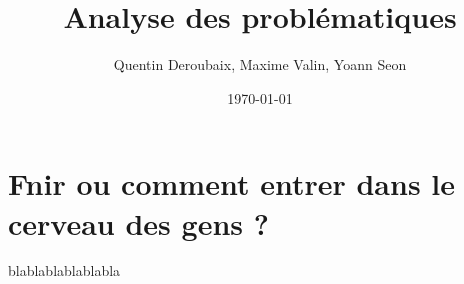 \documentclass[fr]{article}
\begin{document}
\date{\today}

\title{Analyse des problématiques}
\author{Quentin Deroubaix, Maxime Valin, Yoann Seon}
\maketitle

\section{Fnir ou comment entrer dans le cerveau des gens ?}
blablablablablabla
\end{document}
